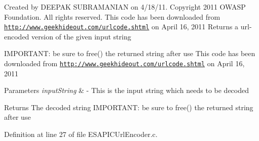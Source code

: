 Created by DEEPAK SUBRAMANIAN on 4/18/11. Copyright 2011 OWASP Foundation. All rights reserved. This code has been downloaded from \href{http://www.geekhideout.com/urlcode.shtml}{\tt http://www.geekhideout.com/urlcode.shtml} on April 16, 2011 Returns a url-\/encoded version of the given input string

IMPORTANT: be sure to free() the returned string after use This code has been downloaded from \href{http://www.geekhideout.com/urlcode.shtml}{\tt http://www.geekhideout.com/urlcode.shtml} on April 16, 2011


\begin{DoxyParams}{Parameters}
{\em inputString} & -\/ This is the input string which needs to be decoded \\
\hline
\end{DoxyParams}
\begin{DoxyReturn}{Returns}
The decoded string IMPORTANT: be sure to free() the returned string after use 
\end{DoxyReturn}


Definition at line 27 of file ESAPICUrlEncoder.c.

